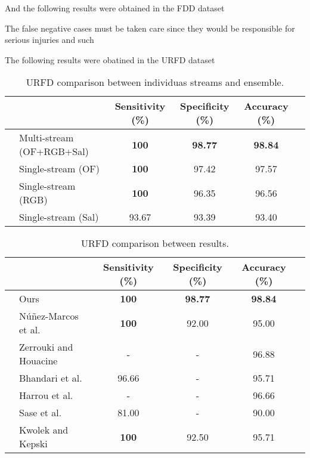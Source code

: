 \documentclass[conference]{IEEEtran}
\begin{document}
And the following results were obtained in the FDD dataset

The false negative cases must be taken care since they would be responsible for serious injuries and such

The following results were obatined in the URFD dataset

\begin{table*}[t]
\centering
\caption{URFD comparison between individuas streams and ensemble.}
\label{tab:urfd-ensem}
\begin{tabular}{llcccl}
\hline
 &  & Sensitivity (\%) & Specificity (\%) & Accuracy (\%) &  \\ \hline
 & Multi-stream (OF+RGB+Sal) & \textbf{100} & \textbf{98.77} & \textbf{98.84} &  \\
 & Single-stream (OF) & \textbf{100} & 97.42 & 97.57 &  \\
 & Single-stream (RGB) & \textbf{100} & 96.35 & 96.56 &  \\
 & Single-stream (Sal) & 93.67 & 93.39 & 93.40 & \\ \hline
\end{tabular}
\end{table*}

\begin{table*}[t]
\centering
\caption{URFD comparison between results.}
\label{tab:urfd-our-their}
\begin{tabular}{llcccl}
\hline
 &                              & Sensitivity (\%) & Specificity (\%) & Accuracy (\%)  &  \\ \hline
 & Ours                         & \textbf{100}      & \textbf{98.77}   & \textbf{98.84} &  \\
 & N\'u\~nez-Marcos et al.~\cite{nunez2017vision}      & \textbf{100}      & 92.00            & 95.00          &  \\
 & Zerrouki and Houacine~\cite{zerrouki2018vision}  & -                & -                & 96.88          &  \\
 & Bhandari et al.~\cite{bhandari2017novel}  & 96.66                & -                & 95.71          &  \\
 & Harrou et al.~\cite{harrou2017vision}  & -                & -                & 96.66          &  \\
 & Sase et al.~\cite{sase2018human}  & 81.00                & -                & 90.00          &  \\
 & Kwolek and Kepski~\cite{kepski2014human}            & \textbf{100}     & 92.50            & 95.71          &  \\ \hline
\end{tabular}
\end{table*}
\end{document}
